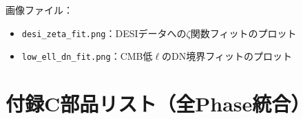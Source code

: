 \documentclass[11pt,a4paper]{article}
\begin{document}
\noindent
画像ファイル：
\begin{itemize}
\item \texttt{desi\_zeta\_fit.png}：DESIデータへの$\zeta$関数フィットのプロット
\item \texttt{low\_ell\_dn\_fit.png}：CMB低$\ell$のDN境界フィットのプロット
\end{itemize}



\section{付録C\quad 部品リスト（全Phase統合）}
\label{app:parts}
\end{document}
